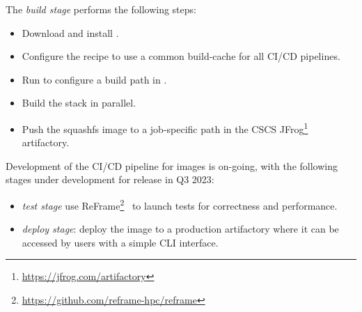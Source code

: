 The \emph{build stage} performs the following steps:
\begin{itemize}
    \item Download and install \stackinator.
    \item Configure the recipe to use a common build-cache for all CI/CD pipelines.
    \item Run \stackinator {} to configure a build path in .
    \item Build the stack in parallel.
    \item Push the squashfs image to a job-specific path in the CSCS JFrog\footnote{\url{https://jfrog.com/artifactory}} artifactory.
\end{itemize}

Development of the CI/CD pipeline for images is on-going, with the following stages under development for release in Q3 2023:
\begin{itemize}
    \item \emph{test stage} use ReFrame\footnote{\url{https://github.com/reframe-hpc/reframe}}~\cite{software:reframe} to launch tests for correctness and performance.
    \item \emph{deploy stage}: deploy the image to a production artifactory where it can be accessed by users with a simple CLI interface.
\end{itemize}

